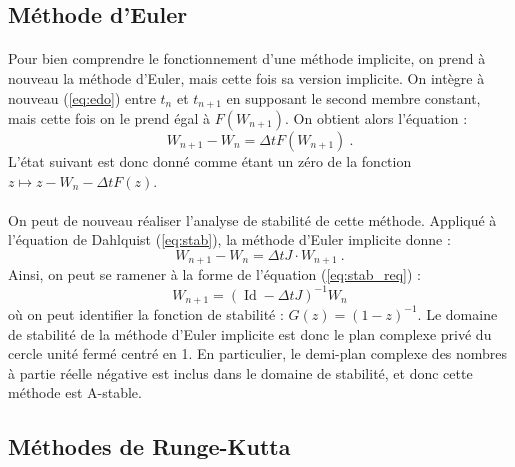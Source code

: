   \paragraph{}

  \subsection{Méthode d'Euler}

    \paragraph{}
    Pour bien comprendre le fonctionnement d'une méthode implicite, on prend à nouveau la méthode d'Euler, mais cette fois sa version implicite.
    On intègre à nouveau (\ref{eq:edo}) entre $t_n$ et $t_{n+1}$ en supposant le second membre constant, mais cette fois on le prend égal à $F\left(W_{n+1}\right)$.
    On obtient alors l'équation :
    \[W_{n+1} - W_n = \Delta tF\left(W_{n+1}\right)\ .\]
    L'état suivant est donc donné comme étant un zéro de la fonction $z\mapsto z - W_n - \Delta tF\left(z\right)$.

    \paragraph{}
    On peut de nouveau réaliser l'analyse de stabilité de cette méthode.
    Appliqué à l'équation de Dahlquist (\ref{eq:stab}), la méthode d'Euler implicite donne :
    \[W_{n+1} - W_n = \Delta tJ\cdot W_{n+1}\ .\]
    Ainsi, on peut se ramener à la forme de l'équation (\ref{eq:stab_req}) :
    \[W_{n+1} = \left(\operatorname{Id} - \Delta tJ\right)^{-1}W_n\]
    où on peut identifier la fonction de stabilité : $G\left(z\right) = \left(1-z\right)^{-1}$.
    Le domaine de stabilité de la méthode d'Euler implicite est donc le plan complexe privé du cercle unité fermé centré en 1.
    En particulier, le demi-plan complexe des nombres à partie réelle négative est inclus dans le domaine de stabilité, et donc cette méthode est A-stable.


  \subsection{Méthodes de Runge-Kutta}

